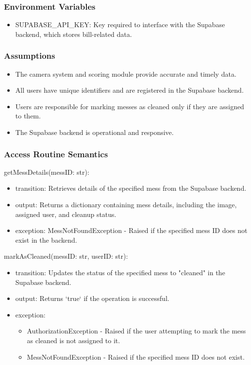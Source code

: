 \documentclass[12pt, titlepage]{article}
\begin{document}
\subsubsection{Environment Variables}

\begin{itemize}
  \item SUPABASE{\_}API{\_}KEY: Key required to interface with the Supabase backend, which stores bill-related data.
  \end{itemize}
  

\subsubsection{Assumptions}

\begin{itemize}
  \item The camera system and scoring module provide accurate and timely data.
  \item All users have unique identifiers and are registered in the Supabase backend.
  \item Users are responsible for marking messes as cleaned only if they are assigned to them.
  \item The Supabase backend is operational and responsive.
\end{itemize}

\subsubsection{Access Routine Semantics}

\noindent getMessDetails(messID: str):
\begin{itemize}
\item transition: Retrieves details of the specified mess from the Supabase backend.
\item output: Returns a dictionary containing mess details, including the image, assigned user, and cleanup status.
\item exception: MessNotFoundException - Raised if the specified mess ID does not exist in the backend.
\end{itemize}

\noindent markAsCleaned(messID: str, userID: str):
\begin{itemize}
\item transition: Updates the status of the specified mess to "cleaned" in the Supabase backend.
\item output: Returns `true` if the operation is successful.
\item exception: 
  \begin{itemize}
    \item AuthorizationException - Raised if the user attempting to mark the mess as cleaned is not assigned to it.
    \item MessNotFoundException - Raised if the specified mess ID does not exist.
  \end{itemize}
\end{itemize}
\end{document}
